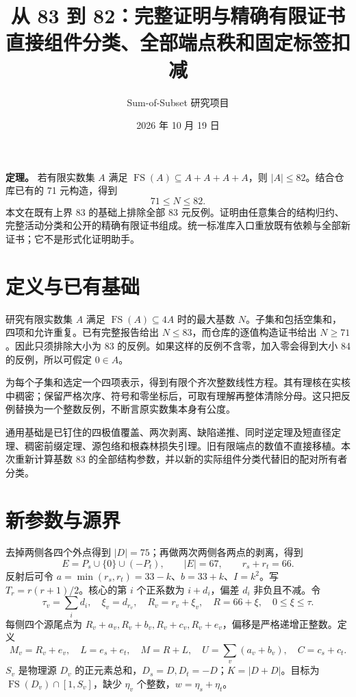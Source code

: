 \documentclass[11pt,a4paper]{article}
\title{从 83 到 82：完整证明与精确有限证书\\\large 直接组件分类、全部端点秩和固定标签扣减}
\author{Sum-of-Subset 研究项目}
\date{2026 年 10 月 19 日}
\begin{document}
\maketitle
\tableofcontents
\newpage
\textbf{定理。} 若有限实数集 \(A\) 满足
\(\operatorname{FS}(A)\subseteq A+A+A+A\)，则
\(|A|\le82\)。结合仓库已有的 71 元构造，得到 \[
\boxed{71\le N\le82}.
\] 本文在既有上界 83 的基础上排除全部 83
元反例。证明由任意集合的结构归约、完整活动分类和公开的精确有限证书组成。统一标准库入口重放既有依赖与全部新证书；它不是形式化证明助手。

\hypertarget{ux5b9aux4e49ux4e0eux5df2ux6709ux57faux7840}{%
\section{定义与已有基础}\label{ux5b9aux4e49ux4e0eux5df2ux6709ux57faux7840}}

研究有限实数集 \(A\) 满足 \(\operatorname{FS}(A)\subseteq4A\)
时的最大基数 \(N\)。子集和包括空集和，四项和允许重复。已有完整报告给出
\(N\le83\)，而仓库的逐值构造证书给出 \(N\ge71\)。因此只须排除大小为 83
的反例。如果这样的反例不含零，加入零会得到大小 84 的反例，所以可假定
\(0\in A\)。

为每个子集和选定一个四项表示，得到有限个齐次整数线性方程。其有理核在实核中稠密；保留严格次序、符号和零坐标后，可取有理解再整体清除分母。这只把反例替换为一个整数反例，不断言原实数集本身有公度。

通用基础是已钉住的四极值覆盖、两次剥离、缺陷递推、同时逆定理及短直径定理、稠密前缀定理、源包络和根森林损失引理。旧有限端点的数值不直接移植。本次重新计算基数
83 的全部结构参数，并以新的实际组件分类代替旧的配对所有者分类。

\hypertarget{ux65b0ux53c2ux6570ux4e0eux6e90ux754c}{%
\section{新参数与源界}\label{ux65b0ux53c2ux6570ux4e0eux6e90ux754c}}

去掉两侧各四个外点得到 \(|D|=75\)；再做两次两侧各两点的剥离，得到 \[
 E=P_s\cup\{0\}\cup(-P_t),\qquad |E|=67,\qquad r_s+r_t=66.
\] 反射后可令 \(a=\min(r_s,r_t)=33-k\)、\(b=33+k\)、\(I=k^2\)。写
\(T_r=r(r+1)/2\)。核心的第 \(i\) 个正系数为 \(i+d_i\)，偏差 \(d_i\)
非负且不减。令 \[
 \tau_v=\sum_i d_i,\quad \xi_v=d_{r_v},\quad R_v=r_v+\xi_v,
 \quad R=66+\xi,\quad 0\le\xi\le\tau.
\] 每侧四个源尾点为
\(R_v+a_v,R_v+b_v,R_v+c_v,R_v+e_v\)，偏移是严格递增正整数。定义 \[
 M_v=R_v+e_v,\quad L=e_s+e_t,\quad M=R+L,
 \quad U=\sum_v(a_v+b_v),\quad C=c_s+c_t.
\] \(S_v\) 是物理源 \(D_v\)
的正元素总和，\(D_s=D,D_t=-D\)；\(K=|D+D|\)。目标为
\(\operatorname{FS}(D_v)\cap[1,S_v]\)，缺少 \(\eta_v\)
个整数，\(w=\eta_s+\eta_t\)。
\end{document}
